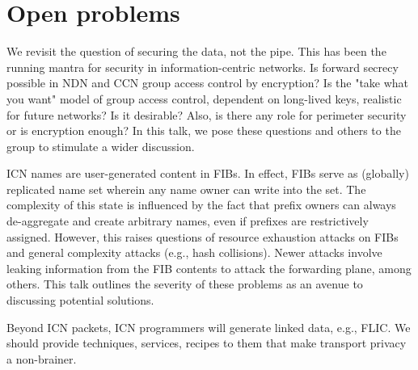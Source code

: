 \documentclass[a4paper,UKenglish]{dagrep}
\begin{document}




\section{Open problems}

\license

We revisit the question of securing the data, not the pipe. This has been the running mantra for security in information-centric networks. Is forward secrecy possible in NDN and CCN group access control by encryption? Is the "take what you want" model of group access control, dependent on long-lived keys, realistic for future networks? Is it desirable? Also, is there any role for perimeter security or is encryption enough? In this talk, we pose these questions and others to the group to stimulate a wider discussion.

\license

ICN names are user-generated content in FIBs. In effect, FIBs serve as (globally) replicated name set wherein any name owner can write into the set. The complexity of this state is influenced by the fact that prefix owners can always de-aggregate and create arbitrary names, even if prefixes are restrictively assigned. However, this raises questions of resource exhaustion attacks on FIBs and general complexity attacks (e.g., hash collisions). Newer attacks involve leaking information from the FIB contents to attack the forwarding plane, among others. This talk outlines the severity of these problems as an avenue to discussing potential solutions.

\license

Beyond ICN packets, ICN programmers will generate linked data, e.g., FLIC. We should provide techniques, services, recipes to them that make transport privacy a non-brainer.
\end{document}
